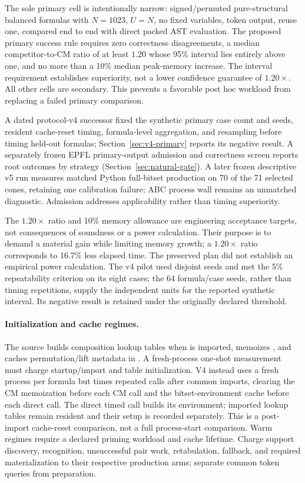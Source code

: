\documentclass[10pt]{article}
\theoremstyle{plain}
\theoremstyle{definition}
\theoremstyle{remark}
\begin{document}
The sole primary cell is intentionally narrow: signed/permuted pure-structural balanced formulas with $N=1023$, $U=N$, no fixed variables, token output, reuse one, compared end to end with direct packed AST evaluation. The proposed primary success rule requires zero correctness disagreements, a median competitor-to-CM ratio of at least $1.20$ whose 95\% interval lies entirely above one, and no more than a 10\% median peak-memory increase. The interval requirement establishes superiority, not a lower confidence guarantee of $1.20\times$. All other cells are secondary. This prevents a favorable post hoc workload from replacing a failed primary comparison.

A dated protocol-v4 successor fixed the synthetic primary case count and seeds, resident cache-reset timing, formula-level aggregation, and resampling before timing held-out formulas; Section~\ref{sec:v4-primary} reports its negative result. A separately frozen EPFL primary-output admission and correctness screen reports root outcomes by strategy (Section~\ref{sec:natural-gate}). A later frozen descriptive v5 run measures matched Python full-bitset production on 70 of the 71 selected cones, retaining one calibration failure; ABC process wall remains an unmatched diagnostic. Admission addresses applicability rather than timing superiority.

The $1.20\times$ ratio and 10\% memory allowance are engineering acceptance targets, not consequences of soundness or a power calculation. Their purpose is to demand a material gain while limiting memory growth; a $1.20\times$ ratio corresponds to 16.7\% less elapsed time. The preserved plan did not establish an empirical power calculation. The v4 pilot used disjoint seeds and met the 5\% repeatability criterion on its eight cases; the 64 formula/case seeds, rather than timing repetitions, supply the independent units for the reported synthetic interval. Its negative result is retained under the originally declared threshold.

\paragraph{Initialization and cache regimes.}
The source builds composition lookup tables when  is imported, memoizes , and caches permutation/lift metadata in . A fresh-process one-shot measurement must charge startup/import and table initialization. V4 instead uses a fresh process per formula but times repeated calls after common imports, clearing the CM memoization before each CM call and the bitset-environment cache before each direct call. The direct timed call builds its environment; imported lookup tables remain resident and their setup is recorded separately. This is a post-import cache-reset comparison, not a full process-start comparison. Warm regimes require a declared priming workload and cache lifetime. Charge support discovery, recognition, unsuccessful pair work, retabulation, fallback, and required materialization to their respective production arms; separate common token queries from preparation.
\end{document}
